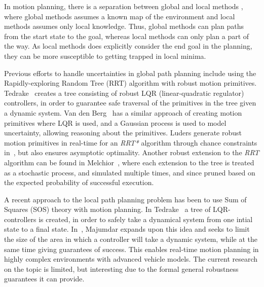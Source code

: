 In motion planning, there is a separation between global and local methods \cite{Hoy2015ClutteredEnvironmentSurvey}, where global methods assumes a known map of the environment and local methods assumes only local knowledge. 
Thus, global methods can plan paths from the start state to the goal, whereas local methods can only plan a part of the way. 
As local methods does explicitly consider the end goal in the planning, they can be more susceptible to getting trapped in local minima.

Previous efforts to handle uncertainties in global path planning include using the Rapidly-exploring Random Tree (RRT) algorithm with robust motion primitives. 
Tedrake~\cite{tedrakeLQRtreesFeedbackMotion2009} creates a tree consisting of robust LQR (linear-quadratic regulator) controllers, in order to guarantee safe traversal of the primitives in the tree given a dynamic system. 
Van den Berg~\cite{vandenbergLQGMPOptimizedPath2011} has a similar approach of creating motion primitives where LQR is used, and a Gaussian process is used to model  uncertainty, allowing reasoning about the primitives.
Luders generate robust motion primitives in real-time for an \textit{RRT*} algorithm through chance constraints in~\cite{luders2013robust}, but also ensures asymptotic optimality.
Another robust extension to the \textit{RRT} algorithm can be found in Melchior~\cite{melchior2007particle}, where each extension to the tree is treated as a stochastic process, and simulated multiple times, and since pruned based on the expected probability of successful execution.



A recent approach to the local path planning problem has been to use Sum of Squares (SOS) theory with motion planning.
In Tedrake~\cite{tedrakeLQRtreesFeedbackMotion2009} a tree of LQR-controllers is created, in order to safely take a dynamical system from one intial state to a final state. 
In~\cite{majumdarFunnelLibrariesRealtime2017}, Majumdar expands upon this idea and seeks to limit the size of the area in which a controller will take a dynamic system, while at the same time giving guarantees of success.
This enables real-time motion planning in highly complex environments with advanced vehicle models. 
The current research on the topic is limited, but interesting due to the formal general robustness guarantees it can provide.


